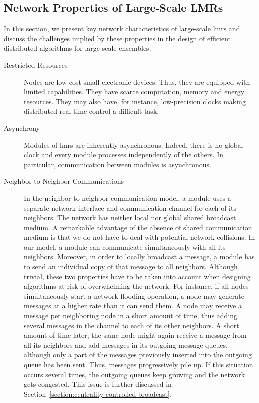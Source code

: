 \subsection{Network Properties of Large-Scale LMRs}
\label{section:context:lmrs}

In this section, we present key network characteristics of large-scale \gls{lmrs} and discuss the challenges implied by these properties in the design of efficient distributed algorithms for large-scale ensembles.

\begin{description}
	
	\item[Restricted Resources] Nodes are low-cost small electronic devices. Thus, they are equipped with limited capabilities. They have scarce computation, memory and energy resources. They may also have, for instance, low-precision clocks making distributed real-time control a difficult task. 
	
	\item[Asynchrony] Modules of \gls{lmrs} are inherently asynchronous. Indeed, there is no global clock and every module processes independently of the others. In particular, communication between modules is asynchronous.
	
	\item[Neighbor-to-Neighbor Communications] In the neighbor-to-neighbor communication model, a module uses a separate network interface and communication channel for each of its neighbors. The network has neither local nor global shared broadcast medium. A remarkable advantage of the absence of shared communication medium is that we do not have to deal with potential network collisions. In our model, a module can communicate simultaneously with all its neighbors. Moreover, in order to locally broadcast a message, a module has to send an individual copy of that message to all neighbors. Although trivial, these two properties have to be taken into account when designing algorithms at risk of overwhelming the network. For instance, if all nodes simultaneously start a network flooding operation, a node may generate messages at a higher rate than it can send them. A node may receive a message per neighboring node in a short amount of time, thus adding several messages in the channel to each of its other neighbors. A short amount of time later, the same node might again receive a message from all its neighbors and add messages in its outgoing message queues, although only a part of the messages previously inserted into the outgoing queue has been sent. Thus, messages progressively pile up. If this situation occurs several times, the outgoing queues keep growing and the network gets congested. This issue is further discussed in Section~\ref{section:centrality-controlled-broadcast}.	


\end{description}
